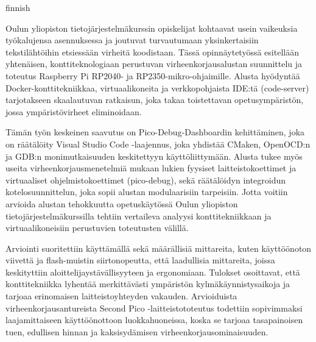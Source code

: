 \begin{thesisabstract}{finnish}
\tiivistelmametadata

Oulun yliopiston tietojärjestelmäkurssin opiskelijat kohtaavat usein vaikeuksia työkalujensa asennuksessa ja joutuvat turvautumaan yksinkertaisiin tekstilähtöihin etsiessään virheitä koodistaan. Tässä opinnäytetyössä esitellään yhtenäisen, konttiteknologiaan perustuvan virheenkorjausalustan suunnittelu ja toteutus Raspberry Pi RP2040- ja RP2350-mikro-ohjaimille. Alusta hyödyntää Docker-konttitekniikkaa, virtuaalikoneita ja verkkopohjaista IDE:tä (code-server) tarjotakseen skaalautuvan ratkaisun, joka takaa toistettavan opetusympäristön, jossa
ympäristövirheet eliminoidaan.

Tämän työn keskeinen saavutus on Pico-Debug-Dashboardin kehittäminen, joka on räätälöity Visual Studio Code -laajennus, joka yhdistää CMaken, OpenOCD:n ja GDB:n monimutkaisuuden keskitettyyn käyttöliittymään. Alusta tukee myös useita virheenkorjausmenetelmiä mukaan lukien fyysiset laitteistokoettimet ja virtuaaliset ohjelmistokoettimet (pico-debug), sekä räätälöidyn integroidun kotelosuunnittelun, joka sopii alustan modulaarisiin tarpeisiin. Jotta voitiin arvioida alustan tehokkuutta opetuskäytössä Oulun yliopiston tietojärjestelmäkurssilla tehtiin vertaileva analyysi konttitekniikkaan ja virtuaalikoneisiin perustuvien toteutusten välillä.

Arviointi suoritettiin käyttämällä sekä määrällisiä mittareita, kuten käyttöönoton viivettä ja flash-muistin siirtonopeutta, että laadullisia mittareita, joissa keskityttiin aloittelijaystävällisyyteen ja ergonomiaan. Tulokset osoittavat, että konttitekniikka lyhentää merkittävästi ympäristön kylmäkäynnistysaikoja ja tarjoaa erinomaisen laitteistoyhteyden vakauden. Arvioiduista virheenkorjausantureista Second Pico -laitteistototeutus todettiin sopivimmaksi laajamittaiseen käyttöönottoon luokkahuoneissa, koska se tarjoaa tasapainoisen tuen, edullisen hinnan ja kaksisydämisen virheenkorjausominaisuuden.
\end{thesisabstract}
